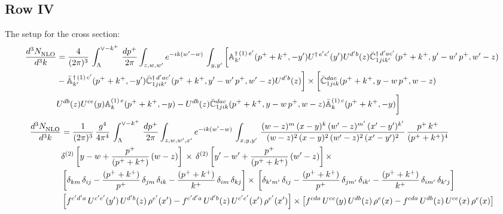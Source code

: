 \documentclass[9pt]{article}
\def\mf#1{\mathbb{#1}}
\numberwithin{equation}{section}
\begin{document}
\subsection{Row IV\,}
The setup for the cross section: 
\begin{align}
    \frac{d^{3}N_{\rm NLO}^{\rm}}{d^{3}k}  & = \frac{4}{(2\pi)^{3}}\,\int_{\Lambda}^{\vee-k^{+}}\, \frac{dp^{+}}{2\pi}\int_{z,w,w^{\prime}} e^{-ik(w^{\prime}-w)}\,  \int_{y,y^{\prime}}\bigg[\mf{A}^{\dagger\, (1)\,e^{\prime}}_{k^{\prime}}(p^{+}+k^{+},-y^{\prime})U^{\dagger\, e^{\prime}c^{\prime}}(y^{\prime})U^{d^{\prime}b}(z) \Bar{\mf{C}}^{\dagger\, d^{\prime}ac^{\prime}}_{1jik^{\prime}}(p^{+}+k^{+},y^{\prime}-w^{\prime}\, p^{+},w^{\prime}-z) \notag \\ &  -\Bar{\mf{A}}^{\dagger\, (1)\,c^{\prime}}_{k^{\prime}}(p^{+}+k^{+},-y^{\prime}) \Bar{\mf{C}}^{\dagger\, d^{\prime}ac^{\prime}}_{1jik^{\prime}}(p^{+}+k^{+},y^{\prime}-w^{\prime}\, p^{+},w^{\prime}-z)U^{d^{\prime}b}(z)\bigg]\times\bigg[\Bar{\mf{C}}^{dac}_{1jik}(p^{+}+k^{+},y-w\, p^{+},w-z)\notag \\ & U^{db}(z)U^{ce}(y) \mf{A}^{(1)\,e}_{k}(p^{+}+k^{+},-y) -U^{db}(z) \Bar{\mf{C}}^{dac}_{1jik}(p^{+}+k^{+},y-w\, p^{+},w-z)\Bar{\mf{A}}^{(1)\,c}_{k}(p^{+}+k^{+},-y)\bigg]\nonumber
\end{align}
\begin{align}
     \frac{d^{3}N_{\rm NLO}^{\rm}}{d^{3}k}  & = \frac{1}{(2\pi)^{3}}\,\frac{g^{4}}{4\pi^{4}}\,\int_{\Lambda}^{\vee-k^{+}}\, \frac{dp^{+}}{2\pi}\int_{z,w,w^{\prime},x'} e^{-ik(w^{\prime}-w)}\,  \int_{x,y,y^{\prime}}\,\frac{(w-z)^{m}\,(x-y)^{k}\,(w'-z)^{m'}\,(x'-y')^{k'}}{(w-z)^{2}\,(x-y)^{2}\,(w'-z)^{2}\,(x'-y')^{2}}\,\frac{p^{+}\,k^{+}}{(p^{+}+k^{+})^{4}}\notag \\ & \delta^{(2)}\left[y-w+\frac{p^{+}}{(p^{+}+k^{+})}\,(w-z)\right]\,\times\, \delta^{(2)}\left[y'-w'+\frac{p^{+}}{(p^{+}+k^{+})}\,(w'-z)\right]\times\notag \\ &  \left[\delta_{km}\,\delta_{ij}-\frac{(p^{+}+k^{+})}{p^{+}}\,\delta_{jm}\,\delta_{ik}-\frac{(p^{+}+k^{+})}{k^{+}}\,\delta_{im}\,\delta_{kj}\right]\times\, \left[\delta_{k'm'}\,\delta_{ij}-\frac{(p^{+}+k^{+})}{p^{+}}\,\delta_{jm'}\,\delta_{ik'}-\frac{(p^{+}+k^{+})}{k^{+}}\,\delta_{im'}\,\delta_{k'j}\right]\notag \\ & \left[f^{c'd'a}\,U^{c'e'}(y')\,U^{d'b}(z)\,\rho^{e'}(x')-f^{c'd'a}\, 
    U^{d'b}(z)\,U^{c'e'}(x')\,\rho^{e'}(x')\right]\times \left[f^{cda}\,U^{ce}(y)\,U^{db}(z)\,\rho^{e}(x)-f^{cda}\, 
    U^{db}(z)\,U^{ce}(x)\,\rho^{e}(x)\right]
\end{align}
\end{document}
